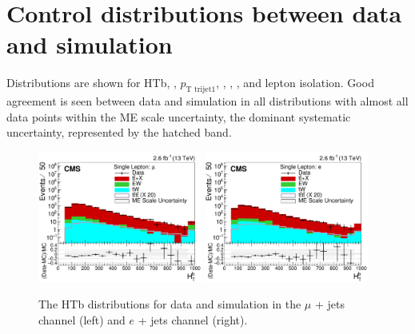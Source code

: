 \section{Control distributions between data and simulation}
Distributions are shown for HTb, \HTrat, $p_{\textrm{T trijet1}}$, \nLtags, \nTtags, \redhadmass, \HTX and lepton isolation. Good agreement is seen between data and simulation in all distributions with almost all data points within the ME scale uncertainty, the dominant systematic uncertainty, represented by the hatched band.

\begin{figure}[ht!]
    \includegraphics[width=0.48\textwidth]{images/Run2/HTb_StackLogY.pdf}
    \includegraphics[width=0.48\textwidth]{images/Run2/HTb_StackLogY_e.pdf}
    \caption{The HTb distributions for data and simulation in the $\mu$ + jets channel (left) and $e$ + jets channel (right).}
    \label{fig:HTB}
\end{figure}


